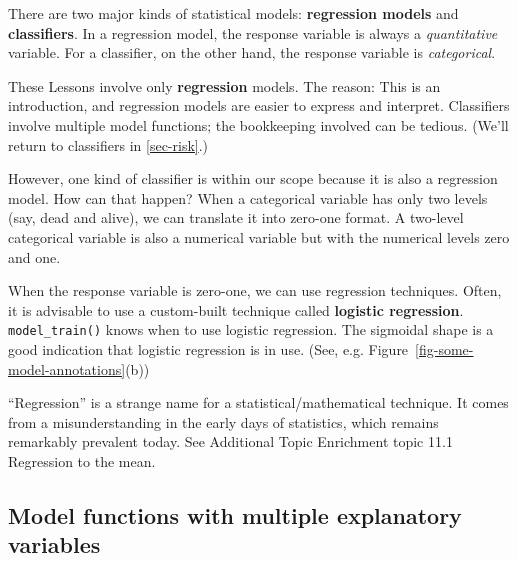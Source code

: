 \documentclass[
  letterpaper,
  DIV=11,
  numbers=noendperiod,
  oneside]{scrartcl}
\begin{document}
\begin{tcolorbox}[enhanced jigsaw, colbacktitle=quarto-callout-note-color!10!white, opacityback=0, breakable, opacitybacktitle=0.6, colback=white, coltitle=black, arc=.35mm, title=\textcolor{quarto-callout-note-color}{\faInfo}\hspace{0.5em}{Regression models versus classifiers}, left=2mm, colframe=quarto-callout-note-color-frame, rightrule=.15mm, bottomrule=.15mm, leftrule=.75mm, bottomtitle=1mm, toptitle=1mm, titlerule=0mm, toprule=.15mm]

There are two major kinds of statistical models: \textbf{regression
models} and \textbf{classifiers}. In a regression model, the response
variable is always a \emph{quantitative} variable. For a classifier, on
the other hand, the response variable is \emph{categorical}.

These Lessons involve only \textbf{regression} models. The reason: This
is an introduction, and regression models are easier to express and
interpret. Classifiers involve multiple model functions; the bookkeeping
involved can be tedious. (We'll return to classifiers in
\ref{sec-risk}.)

However, one kind of classifier is within our scope because it is also a
regression model. How can that happen? When a categorical variable has
only two levels (say, dead and alive), we can translate it into zero-one
format. A two-level categorical variable is also a numerical variable
but with the numerical levels zero and one.

When the response variable is zero-one, we can use regression
techniques. Often, it is advisable to use a custom-built technique
called \textbf{logistic regression}. \texttt{model\_train()} knows when
to use logistic regression. The sigmoidal shape is a good indication
that logistic regression is in use. (See, e.g.
Figure~\ref{fig-some-model-annotations}(b))

``Regression'' is a strange name for a statistical/mathematical
technique. It comes from a misunderstanding in the early days of
statistics, which remains remarkably prevalent today. See Additional
Topic Enrichment topic 11.1 Regression to the mean.

\end{tcolorbox}

\subsection{Model functions with multiple explanatory
variables}\label{model-functions-with-multiple-explanatory-variables}
\end{document}
